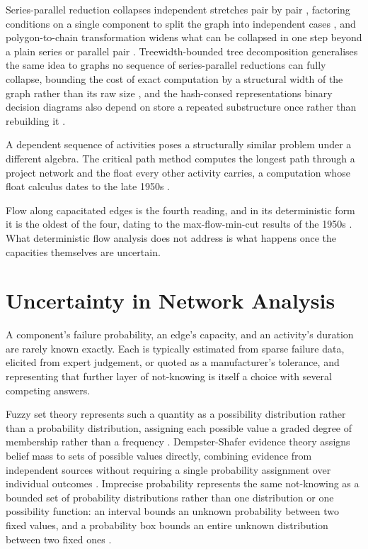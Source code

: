\documentclass[12pt]{report}
\begin{document}
Series-parallel reduction collapses independent stretches pair by pair
\cite{satyanarayana1985linear}, factoring conditions on a single component to split the graph
into independent cases \cite{satyanarayana1983factoring}, and polygon-to-chain transformation
widens what can be collapsed in one step beyond a plain series or parallel pair
\cite{wood1985polygon}. Treewidth-bounded tree decomposition generalises the same idea to graphs
no sequence of series-parallel reductions can fully collapse, bounding the cost of exact
computation by a structural width of the graph rather than its raw size
\cite{goharshady2020treewidth}, and the hash-consed representations binary decision diagrams also
depend on store a repeated substructure once rather than rebuilding it
\cite{filliatre2006hashconsing}.

A dependent sequence of activities poses a structurally similar problem under a different
algebra. The critical path method computes the longest path through a project network and the
float every other activity carries, a computation whose float calculus dates to the late 1950s
\cite{kelley1959critical}.

Flow along capacitated edges is the fourth reading, and in its deterministic form it is the
oldest of the four, dating to the max-flow-min-cut results of the 1950s \cite{ford1956}. What
deterministic flow analysis does not address is what happens once the capacities themselves are
uncertain.

\section{Uncertainty in Network Analysis}
\label{sec:bg-uncertainty}

A component's failure probability, an edge's capacity, and an activity's duration are rarely
known exactly. Each is typically estimated from sparse failure data, elicited from expert
judgement, or quoted as a manufacturer's tolerance, and representing that further layer of
not-knowing is itself a choice with several competing answers.

Fuzzy set theory represents such a quantity as a possibility distribution rather than a
probability distribution, assigning each possible value a graded degree of membership rather
than a frequency \cite{zadeh1965fuzzy}. Dempster-Shafer evidence theory assigns belief mass to
sets of possible values directly, combining evidence from independent sources without requiring
a single probability assignment over individual outcomes \cite{shafer1976mathematical}. Imprecise
probability represents the same not-knowing as a bounded set of probability distributions rather
than one distribution or one possibility function: an interval bounds an unknown probability
between two fixed values, and a probability box bounds an entire unknown distribution between two
fixed ones \cite{ferson2003constructing,williamson1990probabilistic}.
\end{document}
